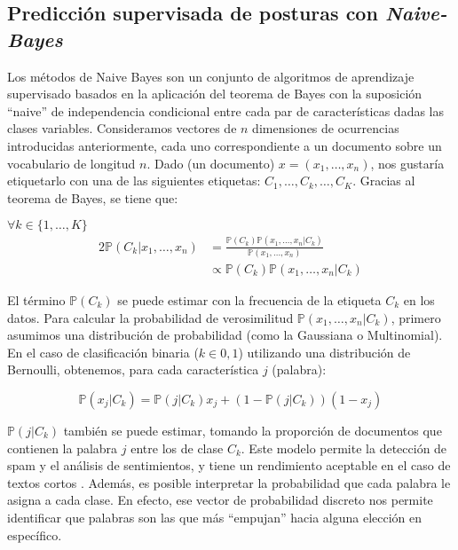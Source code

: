 \documentclass[
	spanish, %
	letterpaper, oneside
]{article}
\begin{document}
\subsection{Predicción supervisada de posturas con \textit{Naive-Bayes}}

Los métodos de Naive Bayes son un conjunto de algoritmos de aprendizaje supervisado basados en la aplicación del teorema de Bayes con la suposición ``naive'' de independencia condicional entre cada par de características dadas las clases variables. Consideramos vectores de $n$ dimensiones de ocurrencias introducidas anteriormente, cada uno correspondiente a un documento sobre un vocabulario de longitud $n$. Dado (un documento) $x=(x_1,\dots,x_n)$, nos gustaría etiquetarlo con una de las siguientes etiquetas: $C_1,\dots,C_k,\dots,C_K$. Gracias al teorema de Bayes, se tiene que:

$\forall k \in \{1,\dots,K\}$
\begin{alignat*}{2}
    \mathbb{P}(C_k|x_1,\dots,x_n) & = \displaystyle\frac{\mathbb{P}(C_k)\mathbb{P}(x_1,\dots,x_n|C_k)}{\mathbb{P}(x_1,\dots,x_n)}\\
                                    & \propto \mathbb{P}(C_k)\mathbb{P}(x_1,\dots,x_n|C_k)
\end{alignat*}

El término $\mathbb{P}(C_k)$ se puede estimar con la frecuencia de la etiqueta $C_k$ en los datos. Para calcular la probabilidad de verosimilitud $\mathbb{P}(x_1,\dots,x_n|C_k)$, primero asumimos una distribución de probabilidad (como la Gaussiana o Multinomial). En el caso de clasificación binaria ($k\in{0,1}$) utilizando una distribución de Bernoulli, obtenemos, para cada característica $j$ (palabra):

$$ \mathbb{P}(x_j|C_k) = \mathbb{P}(j|C_k)x_j + (1-\mathbb{P}(j|C_k))(1-x_j)$$

$\mathbb{P}(j|C_k)$ también se puede estimar, tomando la proporción de documentos que contienen la palabra $j$ entre los de clase $C_k$. Este modelo permite la detección de spam y el análisis de sentimientos, y tiene un rendimiento aceptable en el caso de textos cortos \cite{bayes}. Además, es posible interpretar la probabilidad que cada palabra le asigna a cada clase. En efecto, ese vector de probabilidad discreto nos permite identificar que palabras son las que más ``empujan'' hacia alguna elección en específico.
\end{document}
